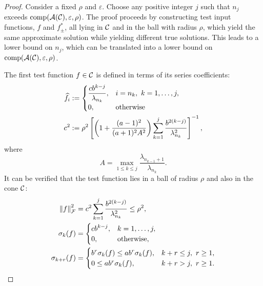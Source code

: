 \documentclass[final]{elsarticle}
\theoremstyle{definition}
\theoremstyle{remark}
\begin{document}
\begin{proof}
Consider a fixed $\rho$ and $\varepsilon$.  Choose any positive integer $j$ such that $n_j$ exceeds $\operatorname{comp}(\mathcal{A}(\mathcal{C}),\varepsilon,\rho)$.  The proof proceeds by constructing test input functions, $f$ and $f^*_{\pm}$, all lying in $\mathcal{C}$ and in the ball with radius $\rho$, which yield the same approximate solution while yielding different true solutions.  This leads to a lower bound on $n_j$, which can be translated into a lower bound on $\operatorname{comp}(\mathcal{A}(\mathcal{C}),\varepsilon,\rho)$. 

The first test function $f \in \mathcal{C}$ is defined in terms of its series coefficients:
\begin{align}
\nonumber
\hf_i &:= \begin{cases}
\displaystyle
\frac{c b^{k-j}}{\lambda_{n_{k}}},  & i =  n_{k}, \ k = 1, \ldots, j,
\\
0, & \text{otherwise}
\end{cases}
\\
\label{cdef}
c^2 &:=  \rho^2 \left[\left(1+\frac{(a-1)^2}{(a+1)^{2} A^2 }\right)\sum_{k=1}^j \frac{b^{2(k-j)}}{\lambda_{n_{k}}^2}\right]^{-1},
\end{align}
where 
\[A = \max_{1 \le k \le j} \frac{\lambda_{n_{k-1}+1}}{\lambda_{n_k}}.\]
It can be verified that the test function lies in a ball of radius $\rho$ and also in the cone $\mathcal{C}$:
\begin{align}
\label{testfunnorm}
\norm[\cf]{f}^2 &=  c^2\sum_{k=1}^j \frac{ b^{2(k-j)}}{\lambda^2_{n_{k}}} \le \rho^2,
\\
\nonumber
\sigma_k(f) &= \begin{cases}
\displaystyle
c b^{k-j}, & k =1, \ldots, j, \\
0, & \text{otherwise},
\end{cases}
\\
\nonumber
\sigma_{k+r}(f) &= \begin{cases}
\displaystyle 
b^{r} \sigma_k(f) \le a b^r \sigma_k(f), & k+r \le j, \ r \ge 1,
\\
0 \le a b^r \sigma_k(f), & k+r > j, \ r \ge 1.
\end{cases}
\end{align}


\end{proof}
\end{document}
